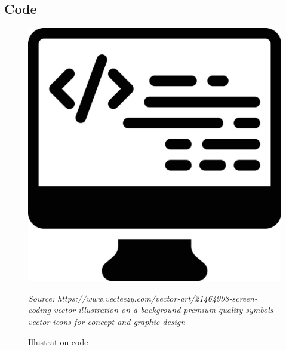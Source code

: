 \documentclass[12pt,a4paper,twoside]{article}
\newcommand{\source}[1]{\vspace{-11pt} \caption*{\small \textit{Source: {#1}} }}
\begin{document}



\subsection{Code}

\begin{figure}[h]
	\centering
	\includegraphics[width=0.5\linewidth]{Figures/Illustration_code}
	\caption{Illustration code}
	\label{fig:illustrationcode}
	\source{https://www.vecteezy.com/vector-art/21464998-screen-coding-vector-illustration-on-a-background-premium-quality-symbols-vector-icons-for-concept-and-graphic-design}
\end{figure}



\end{document}
